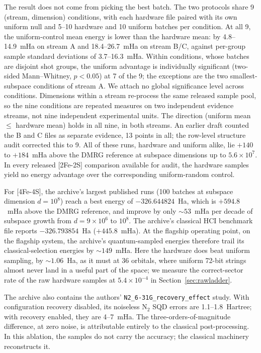 \documentclass[11pt]{article}
\begin{document}
The result does not come from picking the best batch. The two protocols share 9 (stream, dimension) conditions, with each hardware file paired with its own uniform null and 5--10 hardware and 10 uniform batches per condition. At all 9, the uniform-control mean energy is lower than the hardware mean: by 4.8--14.9~mHa on stream A and 18.4--26.7~mHa on stream B/C, against per-group sample standard deviations of 3.7--16.3~mHa. Within conditions, whose batches are disjoint shot groups, the uniform advantage is individually significant (two-sided Mann--Whitney, $p<0.05$) at 7 of the 9; the exceptions are the two smallest-subspace conditions of stream A. We attach no global significance level across conditions. Dimensions within a stream re-process the same released sample pool, so the nine conditions are repeated measures on two independent evidence streams, not nine independent experimental units. The direction (uniform mean $\le$ hardware mean) holds in all nine, in both streams. An earlier draft counted the B and C files as separate evidence, 13 points in all; the row-level structure audit corrected this to 9. All of these runs, hardware and uniform alike, lie $+140$ to $+184$~mHa above the DMRG reference at subspace dimensions up to $5.6\times10^7$. In every released [2Fe-2S] comparison available for audit, the hardware samples yield no energy advantage over the corresponding uniform-random control.

For [4Fe-4S], the archive's largest published runs (100 batches at subspace dimension $d=10^8$) reach a best energy of $-326.644824$~Ha, which is $+594.8$~mHa above the DMRG reference, and improve by only ${\sim}53$~mHa per decade of subspace growth from $d = 9\times10^6$ to $10^8$. The archive's classical HCI benchmark file reports $-326.793854$~Ha ($+445.8$~mHa). At the flagship operating point, on the flagship system, the archive's quantum-sampled energies therefore trail its classical-selection energies by ${\sim}149$~mHa. Here the hardware does beat uniform sampling, by ${\sim}1.06$~Ha, as it must at 36 orbitals, where uniform 72-bit strings almost never land in a useful part of the space; we measure the correct-sector rate of the raw hardware samples at $5.4\times10^{-4}$ in Section~\ref{sec:rawladder}.

The archive also contains the authors' \texttt{N2\_6-31G\_recovery\_effect} study. With configuration recovery disabled, its noiseless N$_2$ SQD errors are 1.1--1.8~Hartree; with recovery enabled, they are 4--7~mHa. The three-orders-of-magnitude difference, at zero noise, is attributable entirely to the classical post-processing. In this ablation, the samples do not carry the accuracy; the classical machinery reconstructs it.
\end{document}
